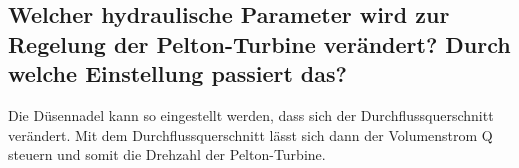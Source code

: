 \subsection{Welcher hydraulische Parameter wird zur Regelung der Pelton-Turbine verändert?
Durch welche Einstellung passiert das?}
Die Düsennadel kann so eingestellt werden, dass sich der Durchflussquerschnitt verändert. Mit dem Durchflussquerschnitt lässt sich dann der Volumenstrom Q steuern und somit die Drehzahl der Pelton-Turbine.